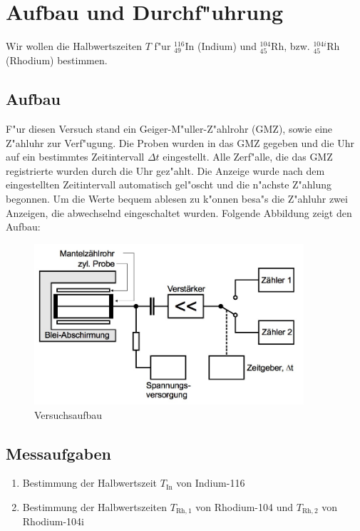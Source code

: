 \section{Aufbau und Durchf"uhrung}
	\label{sec:durchfuehrung}

	Wir wollen die Halbwertszeiten $T$ f"ur ${}_{49}^{116}\mathrm{In}$ (Indium) und ${}_{45}^{104}\mathrm{Rh}$, bzw. ${}_{45}^{104i}\mathrm{Rh}$ (Rhodium) bestimmen.

	\subsection{Aufbau}
		\label{subsec:aufbau}
		F"ur diesen Versuch stand ein Geiger-M"uller-Z"ahlrohr (GMZ), sowie eine Z"ahluhr zur Verf"ugung.
		Die Proben wurden in das GMZ gegeben und die Uhr auf ein bestimmtes Zeitintervall $\Delta t$ eingestellt.
		Alle Zerf"alle, die das GMZ registrierte wurden durch die Uhr gez"ahlt.
		Die Anzeige wurde nach dem eingestellten Zeitintervall automatisch gel"oscht und die n"achste Z"ahlung begonnen.
		Um die Werte bequem ablesen zu k"onnen besa"s die Z"ahluhr zwei Anzeigen, die abwechselnd eingeschaltet wurden.
		Folgende Abbildung zeigt den Aufbau:

		\begin{figure}[!h]
			\centering
			\includegraphics[width = 10cm]{img/aufbau.jpg}
			\caption{Versuchsaufbau \cite{anleitung}}
			\label{fig:aufbau}
		\end{figure}

	\subsection{Messaufgaben}
		\label{subsec:aufgaben}
		\begin{enumerate}
			\item{Bestimmung der Halbwertszeit $T_\mathrm{In}$ von Indium-116}
			\item{Bestimmung der Halbwertszeiten $T_{\mathrm{Rh}, 1}$ von Rhodium-104 und $T_{\mathrm{Rh}, 2}$ von Rhodium-104i}
		\end{enumerate}